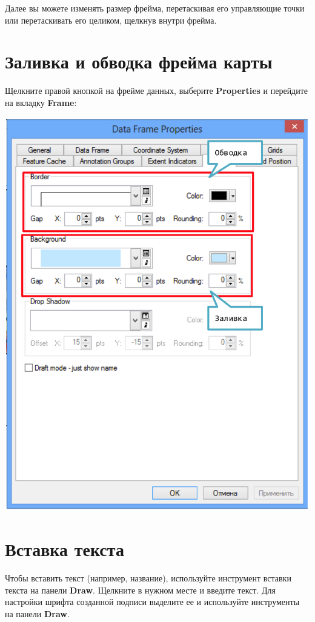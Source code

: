 \documentclass[12pt,]{book}
\begin{document}
Далее вы можете изменять размер фрейма, перетаскивая его управляющие точки или перетаскивать его целиком, щелкнув внутри фрейма.

\hypertarget{section-50}{%
\section{Заливка и обводка фрейма карты}\label{section-50}}

Щелкните правой кнопкой на фрейме данных, выберите \textbf{Properties} и перейдите на вкладку \textbf{Frame}:

\includegraphics{images/Appendix/image54.png}

\hypertarget{section-51}{%
\section{Вставка текста}\label{section-51}}

Чтобы вставить текст (например, название), используйте инструмент вставки текста на панели \textbf{Draw}. Щелкните в нужном месте и введите текст. Для настройки шрифта созданной подписи выделите ее и используйте инструменты на панели \textbf{Draw}.
\end{document}
